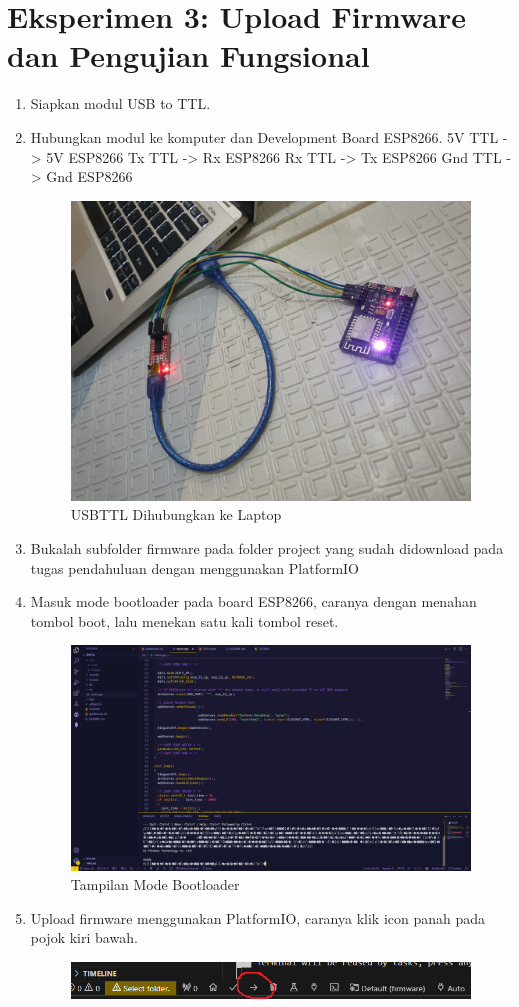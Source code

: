 \section{Eksperimen 3: Upload Firmware dan Pengujian Fungsional}
\begin{enumerate}
    \item Siapkan modul USB to TTL.
    \item Hubungkan modul ke komputer dan Development Board ESP8266.
    \subitem 5V TTL -> 5V ESP8266
    \subitem Tx TTL -> Rx ESP8266
    \subitem Rx TTL -> Tx ESP8266
    \subitem Gnd TTL -> Gnd ESP8266
    \begin{figure}[H]
        \centering
        \includegraphics[width=0.4\linewidth]{P4/img/10_hubungkan_dengan_usbttl_dan_laptop.jpeg}
        \caption{USBTTL Dihubungkan ke Laptop}
        \label{fig:USBTTLLaptop}
    \end{figure}
    \item Bukalah subfolder firmware pada folder project yang sudah didownload pada tugas pendahuluan dengan menggunakan PlatformIO
    \item Masuk mode bootloader pada board ESP8266, caranya dengan menahan tombol boot, lalu menekan satu kali tombol reset.
    \begin{figure}[H]
        \centering
        \includegraphics[width=0.4\linewidth]{P4/img/10_tampilan_ketika_esp_masuk_bootloader.png}
        \caption{Tampilan Mode Bootloader}
        \label{fig:TampilanModeBoot}
    \end{figure}
    \item Upload firmware menggunakan PlatformIO, caranya klik icon panah pada pojok kiri bawah.
    \begin{figure}[H]
        \centering
        \includegraphics[width=0.4\linewidth]{P4/img/14_icon_upload_platformIO.png}

\end{figure}
\end{enumerate}
